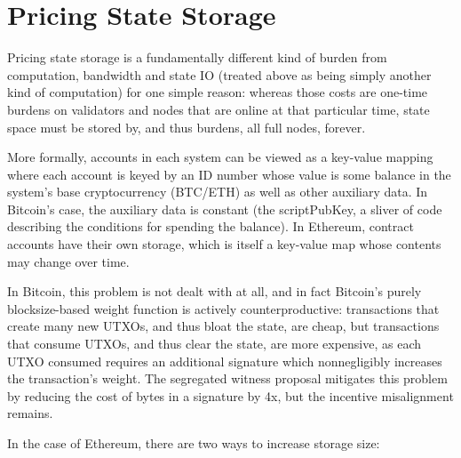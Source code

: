 \documentclass[12pt, final]{article}
\begin{document}
\section{Pricing State Storage}
\label{sect:storage}

Pricing state storage is a fundamentally different kind of burden from computation, bandwidth and state IO (treated above as being simply another kind of computation) for one simple reason: whereas those costs are one-time burdens on validators and nodes that are online at that particular time, state space must be stored by, and thus burdens, all full nodes, forever.

More formally, accounts in each system can be viewed as a key-value mapping where each account is keyed by an ID number whose value is some balance in the system's base cryptocurrency (BTC/ETH) as well as other auxiliary data. In Bitcoin's case, the auxiliary data is constant (the scriptPubKey, a sliver of code describing the conditions for spending the balance). In Ethereum, contract accounts have their own storage, which is itself a key-value map whose contents may change over time.

In Bitcoin, this problem is not dealt with at all, and in fact Bitcoin's purely blocksize-based weight function is actively counterproductive: transactions that create many new UTXOs, and thus bloat the state, are cheap, but transactions that consume UTXOs, and thus clear the state, are more expensive, as each UTXO consumed requires an additional signature which nonnegligibly increases the transaction's weight. The segregated witness proposal mitigates this problem by reducing the cost of bytes in a signature by 4x, but the incentive misalignment remains.

In the case of Ethereum, there are two ways to increase storage size:
\end{document}
